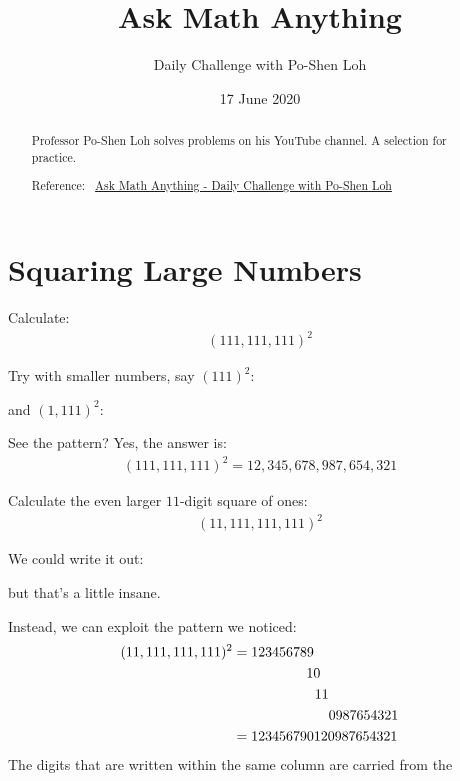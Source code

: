 \documentclass[12pt]{article}
\title{Ask Math Anything}
\author{Daily Challenge with Po-Shen Loh}
\date{17 June 2020}
\begin{document}
\begin{minipage}{\textwidth}
\maketitle
\begin{abstract}
Professor Po-Shen Loh solves problems on his YouTube channel. A selection for practice. 

Reference:~ 
\href{https://www.youtube.com/channel/UCf78EJOm4wQ4xXwSS15PuxQ}{Ask Math Anything - Daily Challenge with Po-Shen Loh}
\end{abstract}
\end{minipage}


\section*{Squaring Large Numbers}
Calculate:
\begin{align*}
(111,111,111)^{2}
\end{align*}

\begin{answer}
Try with smaller numbers, say $(111)^{2}$:
\begin{center}
\qquad
\end{center}
and $(1,111)^{2}$:
\begin{center}
\qquad
\end{center}
See the pattern? Yes, the answer is:
\begin{align*}
(111,111,111)^{2} = 12,345,678,987,654,321
\end{align*}
\end{answer}

Calculate the even larger $11$-digit square of ones:
\begin{align*}
(11,111,111,111)^{2}
\end{align*}

\begin{answer}
We could write it out:
\begin{center}
\qquad
\end{center}
but that's a little insane.

Instead, we can exploit the pattern we noticed:
\begin{align*}
(11,111,111,111)^{2}
& = 123456789\\
& \hspace{5.3em} 10\\
& \hspace{5.9em} 11\\
& \hspace{6.9em} 0987654321 \\
& = 123456790120987654321 
\end{align*}
The digits that are written within the same column are carried from the 

\end{answer}


\end{document}

